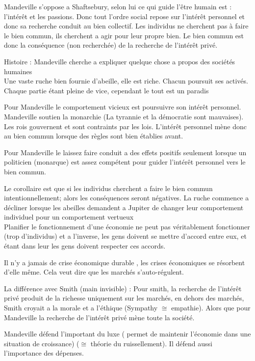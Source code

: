\documentclass{article}
\begin{document}
Mandeville s'oppose a Shaftsebury, selon lui ce qui guide  l'être humain est : l'intérêt et les passions. Donc tout l'ordre social repose sur l'intérêt personnel et donc sa recherche conduit au bien collectif. Les individus ne cherchent pas à faire le bien commun, ils cherchent a agir pour leur propre bien. Le bien commun est donc la conséquence (non recherchée) de la recherche de l'intérêt privé.

Histoire : Mandeville cherche a expliquer quelque chose a propos des sociétés humaines \\
Une vaste ruche bien fournie d'abeille, elle est riche. Chacun poursuit ses activés. Chaque partie étant pleine de vice, cependant le tout est un paradis

Pour Mandeville le comportement vicieux est poursuivre son intérêt personnel. \\
Mandeville soutien la monarchie (La tyrannie et la démocratie sont mauvaises). Les rois gouvernent et sont contraints par les lois. L'intérêt personnel mène donc au bien commun lorsque des règles sont bien établies avant.

Pour Mandeville le laissez faire conduit a des effets positifs seulement lorsque un politicien (monarque) est assez compétent pour guider l'intérêt personnel vers le bien commun.

Le corollaire est que si les individus cherchent a faire le bien commun intentionnellement; alors les conséquences seront négatives. La ruche commence a décliner lorsque les abeilles demandent a Jupiter de changer leur comportement individuel pour un comportement vertueux \\

Planifier le fonctionnement d'une économie ne peut pas véritablement fonctionner (trop d'individus) et a l'inverse, les gens doivent se mettre d'accord entre eux, et étant dans leur  les gens doivent respecter ces accords.

Il n'y a jamais de crise économique durable , les crises économiques se résorbent d'elle même. Cela veut dire que les marchés s'auto-régulent.

La différence avec Smith (main invisible) : Pour smith, la recherche de l'intérêt privé produit de la richesse uniquement sur les marchés, en dehors des marchés, Smith croyait a la morale et a l'éthique (Sympathy $\cong$ empathie). Alors que pour Mandeville la recherche de l'intérêt privé mène toute la société.

Mandeville défend l'important du luxe ( permet de maintenir l'économie dans une situation de croissance) ($\cong$ théorie du ruissellement). Il défend aussi l'importance des dépenses.
\end{document}

